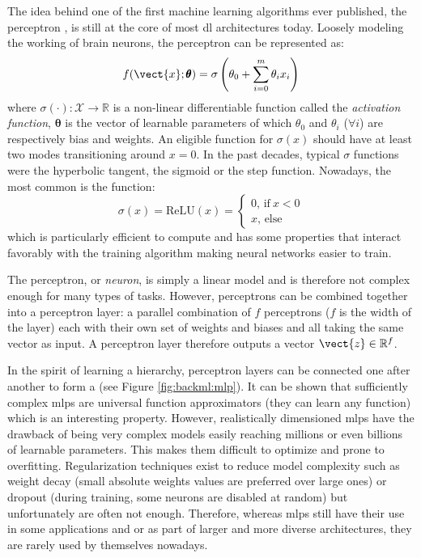 The idea behind one of the first machine learning algorithms ever published, the
perceptron \cite{rosenblatt1958perceptron}, is still at the core of most
\acrlong{dl} architectures today. Loosely modeling the working of brain neurons,
the perceptron can be represented as:
\begin{equation}
\label{eqn:backml:perceptron}
f(\vect{x};\pmb{\theta}) = \sigma\left(\theta_0 + \sum_{i=0}^m \theta_i x_i\right)
\end{equation}
where $\sigma(\cdot): \mathcal{X} \rightarrow \mathbb{R}$ is a non-linear
differentiable function called the \textit{activation function}, $\pmb{\theta}$ is the 
vector of learnable parameters of which $\theta_0$ and $\theta_i$ ($\forall i$) are 
respectively bias and weights. An eligible function
for $\sigma(x)$ should have at least two modes transitioning around $x=0$. In the
past decades, typical $\sigma$ functions were the hyperbolic tangent, the sigmoid
or the step function. Nowadays, the most common is the  function:
\begin{equation}
  \label{eqn:backml:relu}
  \sigma(x) = \text{ReLU}(x) = \begin{cases}
  0\text{, if}~ x < 0\\
  x\text{, else}
  \end{cases}
\end{equation}
which is particularly efficient to compute
and has some properties that interact favorably with the training algorithm making
neural networks easier to train.

The perceptron, or \textit{neuron}, is simply a linear model and is therefore not
complex enough for many types of tasks. However, perceptrons can be combined together
into a perceptron layer: a parallel combination of $f$ perceptrons ($f$ is the
width of the layer) each with their own set of weights and biases and all taking
the same vector as input. A perceptron layer therefore outputs a vector
$\vect{z} \in \mathbb{R}^f$.

In the spirit of learning a hierarchy, perceptron layers can be connected one
after another to form a  (see Figure \ref{fig:backml:mlp}). It
can be shown that sufficiently complex \acrshort{mlp}s are universal function
approximators (\ie they can learn any function) \cite{hornik1989multilayer}
which is an interesting property. However, realistically dimensioned \acrshort{mlp}s
have the drawback of being very complex models easily reaching millions or even
billions of learnable parameters. This makes them difficult to optimize and prone
to overfitting. Regularization techniques exist to reduce model complexity such
as weight decay (\ie small absolute weights values are preferred over large
ones) or dropout \cite{srivastava2014dropout} (\ie during training, some
neurons are disabled at random) but unfortunately are often not enough. Therefore,
whereas \acrshort{mlp}s still have their use in some applications and or as part
of larger and more diverse architectures, they are rarely used by themselves
nowadays.

